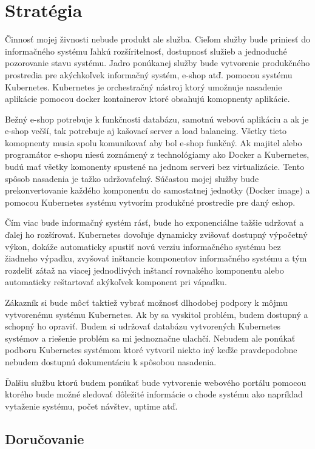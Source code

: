 \chapter{Stratégia}

Činnosť mojej živnosti nebude produkt ale služba. Cieľom služby bude priniesť do informačného systému ľahkú rozšíritelnosť, dostupnosť služieb a jednoduché pozorovanie stavu systému. Jadro ponúkanej služby bude vytvorenie produkčného prostredia pre akýchkoľvek informačný systém, e-shop atď. pomocou systému Kubernetes. Kubernetes je orchestračný nástroj ktorý umožnuje nasadenie aplikácie pomocou docker kontainerov ktoré obsahujú komopnenty aplikácie. 

Bežný e-shop potrebuje k funkčnosti databázu, samotnú webovú aplikáciu a ak je e-shop večší, tak potrebuje aj kašovací server a load balancing. Všetky tieto komopnenty musia spolu komunikovať aby bol e-shop funkčný. Ak majitel alebo programátor e-shopu niesú zoznámený z technológiamy ako Docker a Kubernetes, budú mať všetky komonenty spustené na jednom serveri bez virtualizácie. Tento spôsob nasadenia je tažko udržovaťelný. Súčastou mojej služby bude prekonvertovanie každého komponentu do samostatnej jednotky (Docker image) a pomocou Kubernetes systému vytvorím produkčné prostredie pre daný eshop.

Čím viac bude informačný systém rásť, bude ho exponenciálne tažšie udržovať a ďalej ho rozšírovať. Kubernetes dovoľuje dynamicky zvišovať dostupný výpočetný výkon, dokáže automaticky spustiť novú verziu informačného systému bez žiadneho výpadku, zvyšovať inštancie komponentov informačného systému a tým rozdeliť zátaž na viacej jednodlivých inštancí rovnakého komponentu alebo automaticky reštartovať akýkoľvek komponent pri vápadku. 

Zákazník si bude môcť taktiež vybrať možnosť dlhodobej podpory k môjmu vytvorenému systému Kubernetes. Ak by sa vyskitol problém, budem dostupný a schopný ho opraviť. Budem si udržovať databázu vytvorených Kubernetes systémov a riešenie problém sa mi jednoznačne ulachčí. Nebudem ale ponúkať podboru Kubernetes systémom ktoré vytvoril niekto iný keďže pravdepodobne nebudem dostupnú dokumentáciu k spôsobou nasadenia.

Ďalšiu službu ktorú budem ponúkať bude vytvorenie webového portálu pomocou ktorého bude možné sledovať dôležité informácie o chode systému ako napríklad vytaženie systému, počet návštev, uptime atď.


\section{Doručovanie}

